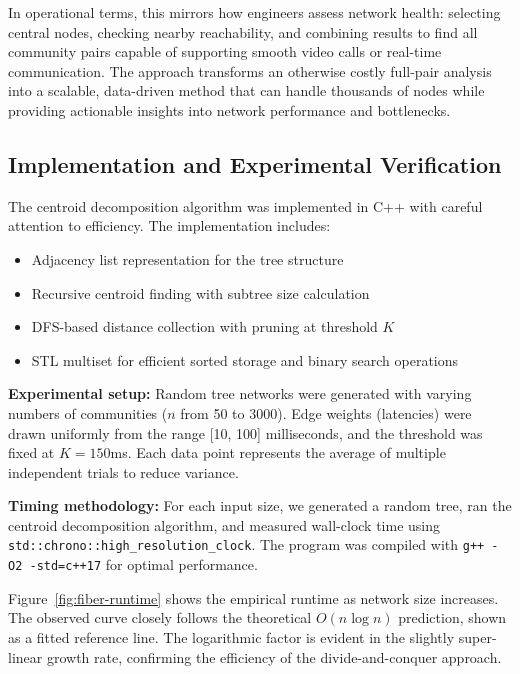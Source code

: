 \documentclass[sigconf]{acmart}
\begin{document}
In operational terms, this mirrors how engineers assess network health: selecting central nodes, checking nearby reachability, and combining results to find all community pairs capable of supporting smooth video calls or real-time communication. The approach transforms an otherwise costly full-pair analysis into a scalable, data-driven method that can handle thousands of nodes while providing actionable insights into network performance and bottlenecks.


\subsection{Implementation and Experimental Verification}
\label{subsec:implementation-dc}
The centroid decomposition algorithm was implemented in C++ with careful attention to efficiency. The implementation includes:
\begin{itemize}[leftmargin=*]
  \item Adjacency list representation for the tree structure
  \item Recursive centroid finding with subtree size calculation
  \item DFS-based distance collection with pruning at threshold \(K\)
  \item STL multiset for efficient sorted storage and binary search operations
\end{itemize}

\textbf{Experimental setup:} Random tree networks were generated with varying numbers of communities (\(n\) from 50 to 3000). Edge weights (latencies) were drawn uniformly from the range [10, 100] milliseconds, and the threshold was fixed at \(K = 150\)ms. Each data point represents the average of multiple independent trials to reduce variance.

\textbf{Timing methodology:} For each input size, we generated a random tree, ran the centroid decomposition algorithm, and measured wall-clock time using \texttt{std::chrono::high\_resolution\_clock}. The program was compiled with \texttt{g++ -O2 -std=c++17} for optimal performance.

Figure~\ref{fig:fiber-runtime} shows the empirical runtime as network size increases. The observed curve closely follows the theoretical \(O(n \log n)\) prediction, shown as a fitted reference line. The logarithmic factor is evident in the slightly super-linear growth rate, confirming the efficiency of the divide-and-conquer approach.
\end{document}
